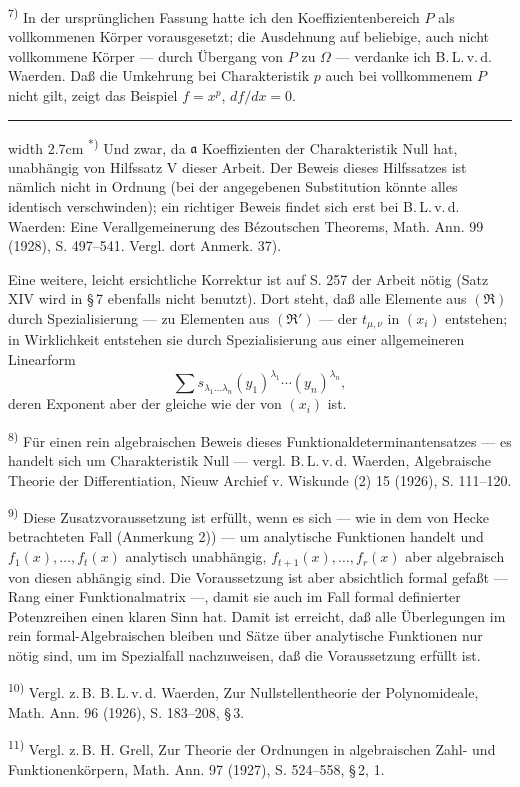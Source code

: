 {\noindent\textsuperscript{7)} In der ursprünglichen Fassung hatte ich den Koeffizientenbereich $P$ als vollkommenen Körper vorausgesetzt; die Ausdehnung auf beliebige, auch nicht vollkommene Körper --- durch Übergang von $P$ zu $\Omega$ --- verdanke ich B.\,L.\,v.\,d. Waerden. Daß die Umkehrung bei Charakteristik $p$ auch bei vollkommenem $P$ nicht gilt, zeigt das Beispiel $f=x^p$, $df/dx=0$.

\medskip
\hrule width 2.7cm
\smallskip
\noindent\textsuperscript{*)} Und zwar, da $\mathfrak{a}$ Koeffizienten der Charakteristik Null hat, unabhängig von Hilfssatz V dieser Arbeit. Der Beweis dieses Hilfssatzes ist nämlich nicht in Ordnung (bei der angegebenen Substitution könnte alles identisch verschwinden); ein richtiger Beweis findet sich erst bei B.\,L.\,v.\,d. Waerden: Eine Verallgemeinerung des Bézoutschen Theorems, Math. Ann. 99 (1928), S. 497--541. Vergl. dort Anmerk. 37).

Eine weitere, leicht ersichtliche Korrektur ist auf S. 257 der Arbeit nötig (Satz XIV wird in \S\,7 ebenfalls nicht benutzt). Dort steht, daß alle Elemente aus $(\mathfrak{R})$ durch Spezialisierung --- zu Elementen aus $(\mathfrak{R}')$ --- der $t_{\mu,\nu}$ in $(x_i)$ entstehen; in Wirklichkeit entstehen sie durch Spezialisierung aus einer allgemeineren Linearform
\[
\sum s_{\lambda_1\ldots\lambda_n}(y_1)^{\lambda_1}\cdots(y_n)^{\lambda_n},
\]
deren Exponent aber der gleiche wie der von $(x_i)$ ist.

\noindent\textsuperscript{8)} Für einen rein algebraischen Beweis dieses Funktionaldeterminantensatzes --- es handelt sich um Charakteristik Null --- vergl. B.\,L.\,v.\,d. Waerden, Algebraische Theorie der Differentiation, Nieuw Archief v. Wiskunde (2) 15 (1926), S. 111--120.

\noindent\textsuperscript{9)} Diese Zusatzvoraussetzung ist erfüllt, wenn es sich --- wie in dem von Hecke betrachteten Fall (Anmerkung 2)) --- um analytische Funktionen handelt und $f_1(x),\ldots,f_t(x)$ analytisch unabhängig, $f_{t+1}(x),\ldots,f_r(x)$ aber algebraisch von diesen abhängig sind. Die Voraussetzung ist aber absichtlich formal gefaßt --- Rang einer Funktionalmatrix ---, damit sie auch im Fall formal definierter Potenzreihen einen klaren Sinn hat. Damit ist erreicht, daß alle Überlegungen im rein formal-Algebraischen bleiben und Sätze über analytische Funktionen nur nötig sind, um im Spezialfall nachzuweisen, daß die Voraussetzung erfüllt ist.

\noindent\textsuperscript{10)} Vergl. z.\,B. B.\,L.\,v.\,d. Waerden, Zur Nullstellentheorie der Polynomideale, Math. Ann. 96 (1926), S. 183--208, \S\,3.

\noindent\textsuperscript{11)} Vergl. z.\,B. H. Grell, Zur Theorie der Ordnungen in algebraischen Zahl- und Funktionenkörpern, Math. Ann. 97 (1927), S. 524--558, \S\,2, 1.
}

